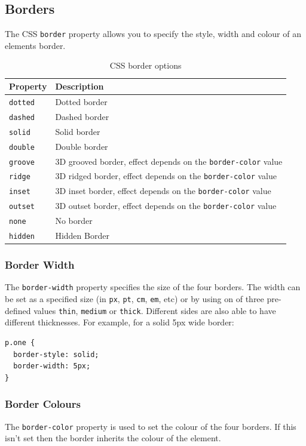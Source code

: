 \documentclass{thomasClass}
\begin{document}
\subsection{Borders}
The CSS \verb|border| property allows you to specify the style, width and colour of an elements border.
\begin{table}[H]
    \centering
    \begin{tabularx}{0.5\textwidth}{X|X}
        Property & Description\\
        \hline
        \verb|dotted| & Dotted border \\
        \verb|dashed| & Dashed border\\
        \verb|solid| & Solid border\\
        \verb|double| & Double border\\
        \verb|groove| & 3D grooved border, effect depends on the \verb|border-color| value\\
        \verb|ridge| & 3D ridged border, effect depends on the \verb|border-color| value\\
        \verb|inset| & 3D inset border, effect depends on the \verb|border-color| value\\
        \verb|outset| & 3D outset border, effect depends on the \verb|border-color| value\\
        \verb|none| & No border\\
        \verb|hidden| & Hidden Border
    \end{tabularx}
    \caption{CSS border options}
    \label{tab:cssBorders}
\end{table}
\subsubsection{Border Width}
The \verb|border-width| property specifies the size of the four borders. The width can be set as a specified size (in \verb|px|, \verb|pt|, \verb|cm|, \verb|em|, etc) or by using on of three pre-defined values \verb|thin|, \verb|medium| or \verb|thick|. Different sides are also able to have different thicknesses. For example, for a solid 5px wide border:
\begin{Verbatim}[breaklines=true, breakanywhere=true]
p.one {
  border-style: solid;
  border-width: 5px;
}
\end{Verbatim}
\subsubsection{Border Colours}
The \verb|border-color| property is used to set the colour of the four borders. If this isn't set then the border inherits the colour of the element.
\end{document}
